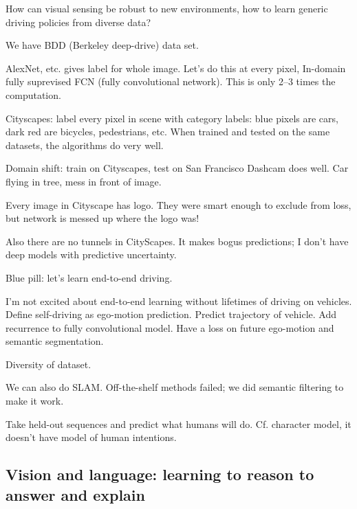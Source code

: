 How can visual sensing be robust to new environments, how to learn generic driving policies from diverse data?

We have BDD (Berkeley deep-drive) data set. %

AlexNet, etc. gives label for whole image. Let's do this at every pixel, In-domain fully suprevised FCN (fully convolutional network). This is only 2--3 times the computation. 

Cityscapes: label every pixel in scene with category labels: blue pixels are cars, dark red are bicycles, pedestrians, etc. 
When trained and tested on the same datasets, the algorithms do very well.

Domain shift: train on Cityscapes, test on San Francisco Dashcam does well. Car flying in tree, mess in front of image.

Every image in Cityscape has logo. They were smart enough to exclude from loss, but network is messed up where the logo was!

Also there are no tunnels in CityScapes. It makes bogus predictions; I don't have deep models with predictive uncertainty. %

Blue pill: let's learn end-to-end driving. 




I'm not excited about end-to-end learning without lifetimes of driving on vehicles. Define self-driving as ego-motion prediction. Predict trajectory of vehicle. Add recurrence to fully convolutional model. Have a loss on future ego-motion and semantic segmentation.

Diversity of dataset.

We can also do SLAM. Off-the-shelf methods failed; we did semantic filtering to make it work.

Take held-out sequences and predict what humans will do.
Cf. character model, it doesn't have model of human intentions.

\subsection{Vision and language: learning to reason to answer and explain}

